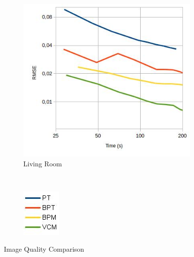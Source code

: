 \begin{figure}[H]
\begin{subfigure}[h]{0.45\textwidth}
\includegraphics[width=\textwidth]{img/livingroomImgq.jpg}
\caption{\label{img:livingroomImgq} Living Room}
\end{subfigure}
~
\begin{subfigure}[h]{0.1\textwidth}
\includegraphics[width=\textwidth]{img/ImgqLeg.jpg}
\end{subfigure}

\caption{\label{img:Imgq} Image Quality Comparison}

\end{figure}

